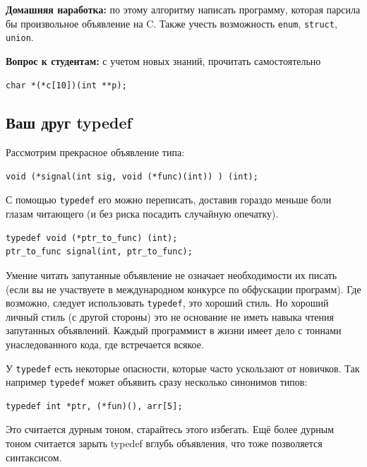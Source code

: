 \documentclass[a4paper,12pt,oneside]{book}
\newif\ifanswers
\begin{document}
\textbf{Домашняя наработка:} по этому алгоритму написать программу, которая парсила бы произвольное объявление на C. Также учесть возможность \lstinline!enum!, \lstinline!struct!, \lstinline!union!.

\textbf{Вопрос к студентам:} с учетом новых знаний, прочитать самостоятельно

\begin{lstlisting}
char *(*c[10])(int **p);
\end{lstlisting}

\ifanswers
Ответ: c is array of 10 pointers to functions, accepting pointer to pointer to int and returning pointer to char.
\fi

\subsection{Ваш друг typedef}\label{FriendTypedef}

Рассмотрим прекрасное объявление типа:

\begin{lstlisting}
void (*signal(int sig, void (*func)(int)) ) (int);
\end{lstlisting}

С помощью \lstinline!typedef! его можно переписать, доставив гораздо меньше боли глазам читающего (и без риска посадить случайную опечатку).

\begin{lstlisting}
typedef void (*ptr_to_func) (int);
ptr_to_func signal(int, ptr_to_func);
\end{lstlisting}

Умение читать запутанные объявление не означает необходимости их писать (если вы не участвуете в международном конкурсе по обфускации программ). Где возможно, следует использовать \lstinline!typedef!, это хороший стиль. Но хороший личный стиль (с другой стороны) это не основание не иметь навыка чтения запутанных объявлений. Каждый программист в жизни имеет дело с тоннами унаследованного кода, где встречается всякое.

У \lstinline!typedef! есть некоторые опасности, которые часто ускользают от новичков. Так например \lstinline!typedef! может объявить сразу несколько синонимов типов:

\begin{lstlisting}
typedef int *ptr, (*fun)(), arr[5];
\end{lstlisting}

Это считается дурным тоном, старайтесь этого избегать. Ещё более дурным тоном считается зарыть typedef вглубь объявления, что тоже позволяется синтаксисом.
\end{document}
